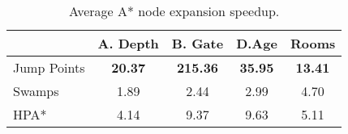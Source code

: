 \begin{table}[tb]
\begin{center}
\begin{tabular}{lcccc}
  \hline
 & A. Depth & B. Gate & D.Age & Rooms \\ 
  \hline
Jump Points & \textbf{20.37} & \textbf{215.36} & \textbf{35.95} & \textbf{13.41} \\ 
  Swamps & 1.89 & 2.44 & 2.99 & 4.70 \\ 
  HPA* & 4.14 & 9.37 & 9.63 & 5.11 \\ 
   \hline
\end{tabular}
\end{center}
\caption{Average A* node expansion speedup.} 
\label{table::jps::nodes}
\end{table}

